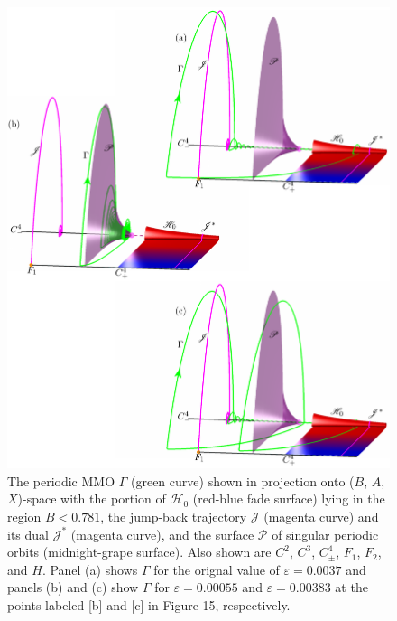 \documentclass{ws-ijbc}
\begin{document}
\begin{figure}[H]
\centering
\includegraphics[]{./figures/MKMO_16.pdf}
\caption{The periodic MMO $\Gamma$ (green curve) shown in projection onto ($B$, $A$, $X$)-space with the portion of $\mathscr{H}_0$ (red-blue fade surface) lying in the region $B<0.781$, the jump-back trajectory $\mathscr{J}$ (magenta curve) and its dual $\mathscr{J}^*$ (magenta curve), and the surface $\mathscr{P}$ of singular periodic orbits (midnight-grape surface).  Also shown are $C^2$, $C^3$, $C^4_\pm$, $F_1$, $F_2$, and $H$.  Panel (a) shows $\Gamma$ for the orignal value of $\varepsilon=0.0037$ and panels (b) and (c) show $\Gamma$ for $\varepsilon=0.00055$ and $\varepsilon=0.00383$ at the points labeled [b] and [c] in Figure 15, respectively.}
\label{figure_16}
\end{figure}
\end{document}
